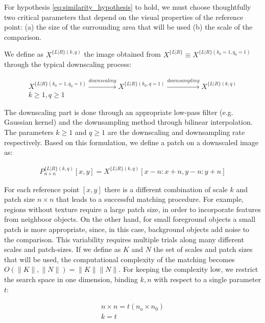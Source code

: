 \documentclass[runningheads]{llncs}
\begin{document}
For hypothesis \ref{eq:similarity_hypothesis} to hold, we must choose thoughtfully two critical parameters that depend on the visual properties of the reference point: (a) the size of the surrounding area that will be used (b) the scale of the comparison.

We define as $X^{ \{L|R\} (k,q)}$ the image obtained from $X^{ \{L|R\}} \equiv X^{ \{L|R\} (k_0=1,q_0=1)}$ through the typical downscaling process:

\begin{equation}
\begin{gathered} \label{eq:downsampling_procedure}
    X^{ \{L|R\} (k_0=1,q_0=1)} \xrightarrow{downscaling} X^{ \{L|R\} (k_0,q=1)} \xrightarrow{downsampling} X^{ \{L|R\} (k,q)}
    \\
    k\geq 1, q\geq 1 
\end{gathered}
\end{equation}

The downscaling part is done through an appropriate low-pass filter (e.g. Gaussian kernel) and the downsampling method through bilinear interpolation. The parameters $k \geq 1$ and $q \geq 1$ are the downscaling and downsampling rate respectively. Based on this formulation, we define a patch on a downscaled image as:

\begin{gather}
    P^{ \{L|R\} (k,q)}_{n \times n}[x,y] = X^{ \{ L|R \}(k,q)} [x-n:x+n, y-n:y+n]
\end{gather}

For each reference point $[x,y]$ there is a different combination of scale $k$ and patch size $n \times n$ that leads to a successful matching procedure. For example, regions without texture require a large patch size, in order to incorporate features from neighboor objects. On the other hand, for small foreground objects a small patch is more appropriate, since, in this case, background objects add noise to the comparison. This variability requires multiple trials along many different scales and patch-sizes. If we define as $K$ and $N$ the set of scales and patch sizes that will be used, the computational complexity of the matching becomes $O(\| K \|, \| N \|) = \| K \| \| N \|$. For keeping the complexity low, we restrict the search space in one dimension, binding $k, n$ with respect to a single parameter $t$:

\begin{gather}
    n \times n = t(n_o \times n_0)\\
    k = t
\end{gather}
\end{document}
